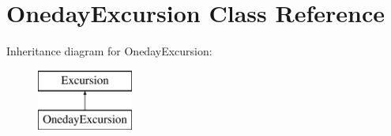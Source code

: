 \hypertarget{class_oneday_excursion}{}\section{Oneday\+Excursion Class Reference}
\label{class_oneday_excursion}
Inheritance diagram for Oneday\+Excursion\+:\begin{figure}[H]
\begin{center}
\leavevmode
\includegraphics[height=2.000000cm]{class_oneday_excursion}
\end{center}
\end{figure}

